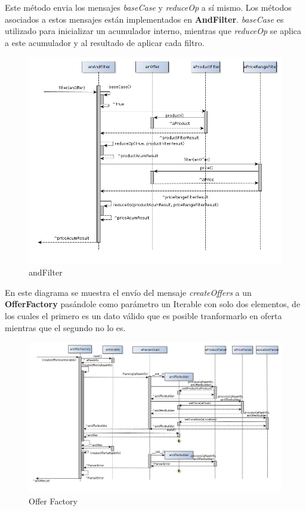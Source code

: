 \documentclass[10pt, a4paper]{article}
\begin{document}
 Este método envia los mensajes \emph{baseCase} y \emph{reduceOp} a sí mismo. Los métodos asociados a estos mensajes están implementados en \textbf{AndFilter}. \emph{baseCase} es utilizado para inicializar un acumulador interno, mientras que \emph{reduceOp} se aplica a este acumulador y al resultado de aplicar cada filtro.
\begin{figure}[H]
\centering
\includegraphics[scale=0.55]{graphics/andFilter_sequence.jpg}
\caption{andFilter}
\end{figure}
\begin{landscape}
\newpage

En este diagrama se muestra el envío del mensaje \emph{createOffers} a un \textbf{OfferFactory} pasándole como parámetro un Iterable con solo dos elementos, de los cuales el primero es un dato válido que es posible tranformarlo en oferta mientras que el segundo no lo es.
\begin{figure}[H]
\centering
\includegraphics[scale=0.60]{graphics/OfferFactory_sequence.jpg}
\caption{Offer Factory}
\end{figure}

\end{landscape}
\end{document}
